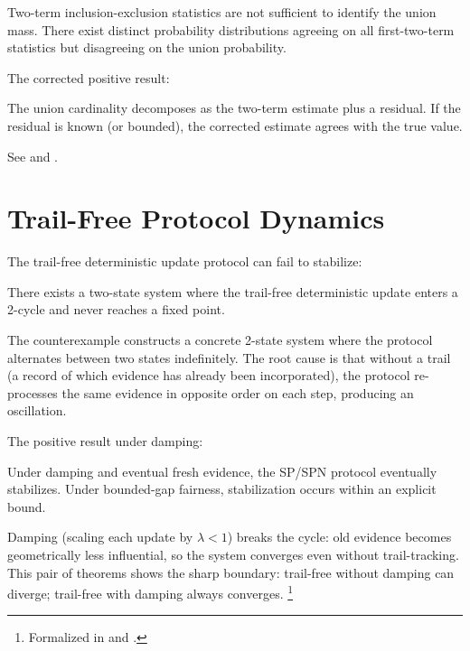 \documentclass[11pt,openany]{report}
\begin{document}
\boundarystart
\begin{theorem}
Two-term inclusion-exclusion statistics are not sufficient to identify the
union mass.  There exist distinct probability distributions agreeing on all
first-two-term statistics but disagreeing on the union probability.
\end{theorem}
\boundaryend

The corrected positive result:

\begin{theorem}
The union cardinality decomposes as the two-term estimate plus a residual.
If the residual is known (or bounded), the corrected estimate agrees with
the true value.
\end{theorem}

See  and
.

\section{Trail-Free Protocol Dynamics}

The trail-free deterministic update protocol can fail to stabilize:

\begin{theorem}
There exists a two-state system where the trail-free deterministic update
enters a 2-cycle and never reaches a fixed point.
\end{theorem}

\noindent
The counterexample constructs a concrete 2-state system where the protocol
alternates between two states indefinitely.  The root cause is that
without a trail (a record of which evidence has already been incorporated),
the protocol re-processes the same evidence in opposite order on each step,
producing an oscillation.

The positive result under damping:

\begin{theorem}
Under damping and eventual fresh evidence, the SP/SPN protocol eventually
stabilizes.  Under bounded-gap fairness, stabilization occurs within an
explicit bound.
\end{theorem}

\noindent
Damping (scaling each update by $\lambda < 1$) breaks the cycle: old
evidence becomes geometrically less influential, so the system converges
even without trail-tracking.  This pair of theorems shows the sharp
boundary: trail-free without damping can diverge; trail-free with damping
always converges.%
\footnote{Formalized in 
  and .}
\end{document}
